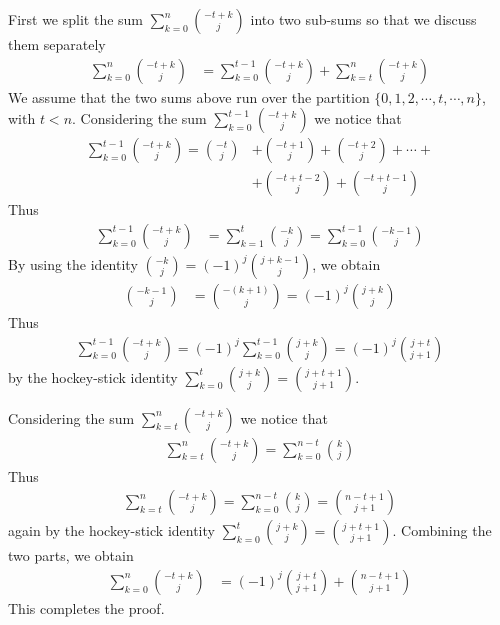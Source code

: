 First we split the sum $\sum_{k=0}^{n} \binom{-t+k}{j}$ into two sub-sums so that we discuss them separately
\begin{align*}
  \sum_{k=0}^{n} \binom{-t+k}{j} &= \sum_{k=0}^{t-1} \binom{-t+k}{j} + \sum_{k=t}^{n} \binom{-t+k}{j}
\end{align*}
We assume that the two sums above run over the partition $\{0,1,2,\cdots,t,\cdots, n\}$, with $t<n$.
Considering the sum $\sum_{k=0}^{t-1} \binom{-t+k}{j}$ we notice that
\begin{align*}
  \sum_{k=0}^{t-1} \binom{-t+k}{j} = \binom{-t}{j}
  &+ \binom{-t +1}{j} + \binom{-t+2}{j} + \cdots + \\
  &+ \binom{-t+t-2}{j} + \binom{-t+t-1}{j}
\end{align*}
Thus
\begin{align*}
  \sum_{k=0}^{t-1} \binom{-t+k}{j} &= \sum_{k=1}^{t} \binom{-k}{j} = \sum_{k=0}^{t-1} \binom{-k-1}{j}
\end{align*}
By using the identity $\binom{-k}{j} = (-1)^j \binom{j+k-1}{j}$, we obtain
\begin{align*}
  \binom{-k-1}{j} &= \binom{-(k+1)}{j} = (-1)^j \binom{j+k}{j}
\end{align*}
Thus
\begin{align*}
  \sum_{k=0}^{t-1} \binom{-t+k}{j} = (-1)^j \sum_{k=0}^{t-1} \binom{j+k}{j} = (-1)^{j} \binom{j+t}{j+1}
\end{align*}
by the hockey-stick identity $\sum_{k=0}^{t} \binom{j+k}{j} = \binom{j+t+1}{j+1}$.

Considering the sum $\sum_{k=t}^{n} \binom{-t+k}{j}$ we notice that
\begin{align*}
  \sum_{k=t}^{n} \binom{-t+k}{j} = \sum_{k=0}^{n-t} \binom{k}{j}
\end{align*}
Thus
\begin{align*}
  \sum_{k=t}^{n} \binom{-t+k}{j} = \sum_{k=0}^{n-t} \binom{k}{j} = \binom{n-t+1}{j+1}
\end{align*}
again by the hockey-stick identity $\sum_{k=0}^{t} \binom{j+k}{j} = \binom{j+t+1}{j+1}$.
Combining the two parts, we obtain
\begin{align*}
  \sum_{k=0}^{n} \binom{-t+k}{j} &= (-1)^j \binom{j+t}{j+1} +  \binom{n-t+1}{j+1}
\end{align*}
This completes the proof.
